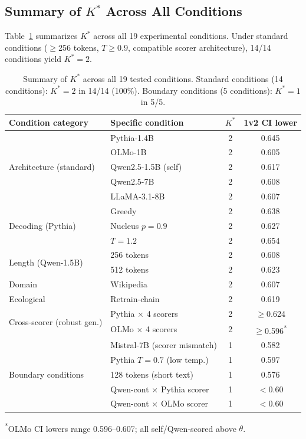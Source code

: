 \documentclass[11pt]{article}
\newcommand{\kstar}{K^{*}}
\newcommand{\thetaval}{\theta}
\begin{document}
\subsection{Summary of $\kstar$ Across All Conditions}

Table~\ref{tab:summary} summarizes $\kstar$ across all 19 experimental conditions. Under standard conditions ($\geq$256 tokens, $T \geq 0.9$, compatible scorer architecture), 14/14 conditions yield $\kstar = 2$.

\begin{table}[t]
\centering
\caption{Summary of $\kstar$ across all 19 tested conditions. Standard conditions (14 conditions): $\kstar = 2$ in 14/14 (100\%). Boundary conditions (5 conditions): $\kstar = 1$ in 5/5.}
\label{tab:summary}
\small
\begin{tabular}{llcc}
\toprule
\textbf{Condition category} & \textbf{Specific condition} & \textbf{$\kstar$} & \textbf{1v2 CI lower} \\
\midrule
\multirow{5}{*}{Architecture (standard)} & Pythia-1.4B & 2 & 0.645 \\
 & OLMo-1B & 2 & 0.605 \\
 & Qwen2.5-1.5B (self) & 2 & 0.617 \\
 & Qwen2.5-7B & 2 & 0.608 \\
 & LLaMA-3.1-8B & 2 & 0.607 \\
\midrule
\multirow{3}{*}{Decoding (Pythia)} & Greedy & 2 & 0.638 \\
 & Nucleus $p{=}0.9$ & 2 & 0.627 \\
 & $T{=}1.2$ & 2 & 0.654 \\
\midrule
\multirow{2}{*}{Length (Qwen-1.5B)} & 256 tokens & 2 & 0.608 \\
 & 512 tokens & 2 & 0.623 \\
\midrule
Domain & Wikipedia & 2 & 0.607 \\
\midrule
Ecological & Retrain-chain & 2 & 0.619 \\
\midrule
\multirow{2}{*}{Cross-scorer (robust gen.)} & Pythia $\times$ 4 scorers & 2 & $\geq$0.624 \\
 & OLMo $\times$ 4 scorers & 2 & $\geq$0.596\textsuperscript{*} \\
\midrule
\midrule
\multirow{5}{*}{Boundary conditions} & Mistral-7B (scorer mismatch) & 1 & 0.582 \\
 & Pythia $T{=}0.7$ (low temp.) & 1 & 0.597 \\
 & 128 tokens (short text) & 1 & 0.576 \\
 & Qwen-cont $\times$ Pythia scorer & 1 & $<$0.60 \\
 & Qwen-cont $\times$ OLMo scorer & 1 & $<$0.60 \\
\bottomrule
\end{tabular}
\vspace{2pt}
\raggedright\footnotesize \textsuperscript{*}OLMo CI lowers range 0.596--0.607; all self/Qwen-scored above $\thetaval$.
\end{table}
\end{document}
